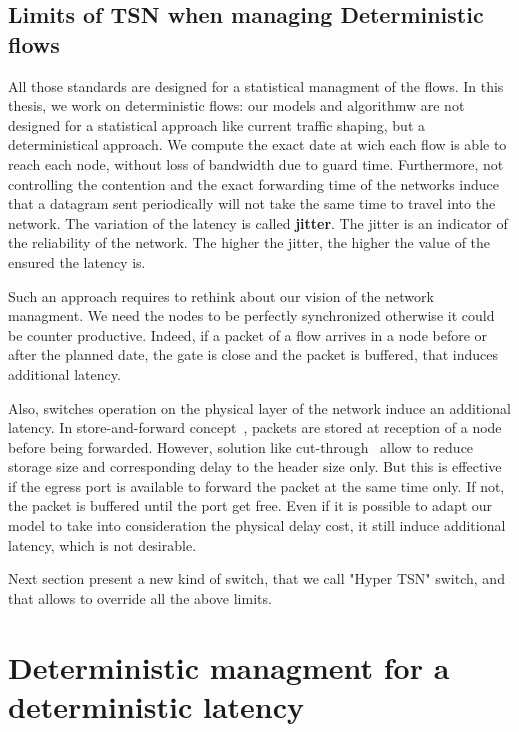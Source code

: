 \subsection{Limits of TSN when managing Deterministic flows}

All those standards are designed for a statistical managment of the flows. In this thesis, we work on deterministic flows: our models and algorithmw are not designed for a statistical approach like current traffic shaping, but a deterministical approach. We compute the exact date at wich each flow is able to reach each node, without loss of bandwidth due to guard time. Furthermore, not controlling the contention and the exact forwarding time of the networks induce that a datagram sent periodically will not take the same time to travel into the network. The variation of the latency is called \textbf{jitter}. The jitter is an indicator of the reliability of the network. The higher the jitter, the higher the value of the ensured the latency is.

Such an approach requires to rethink about our vision of the network managment. We need the nodes to be perfectly synchronized otherwise it could be counter productive. Indeed, if a packet of a flow arrives in a node before or after the planned date, the gate is close and the packet is buffered, that induces additional latency.

Also, switches operation on the physical layer of the network induce an additional latency. In store-and-forward concept~\cite{tindell1992store}, packets are stored at reception of a node before being forwarded. However, solution like cut-through~\cite{kermani1979virtual} allow to reduce storage size and corresponding delay to the header size only. But this is effective if the egress port is available to forward the packet at the same time only. If not, the packet is buffered until the port get free. Even if it is possible to adapt our model to take into consideration the physical delay cost, it still induce additional latency, which is not desirable.

Next section present a new kind of switch, that we call "Hyper TSN" switch, and that allows to override all the above limits.

\section{Deterministic managment for a deterministic latency}
\label{sec:platform}


